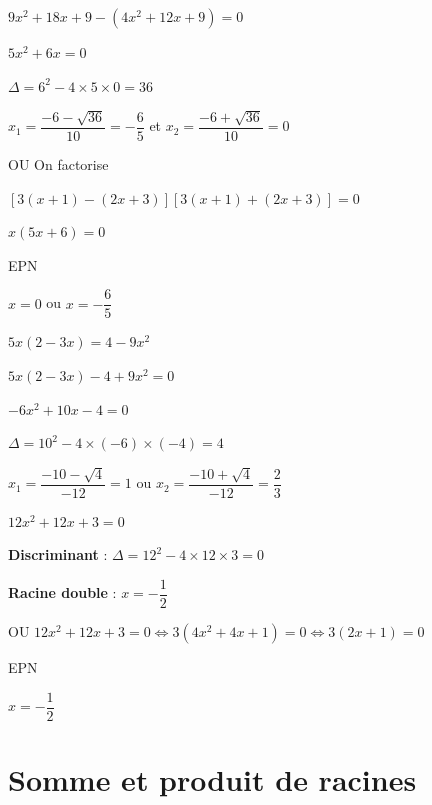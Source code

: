 \documentclass[11pt,a4paper]{article}  %
\begin{document}
\begin{enumMet}
\begin{corrBox}
\begin{minipage}[c]{0.48\linewidth}
				$9x^2+18x+9-(4x^2+12x+9)=0$
				
				$5x^2+6x=0$
				
				$\Delta=6^2-4\times 5\times 0=36$
				
				$x_1=\dfrac{-6-\sqrt{36}}{10}=-\dfrac{6}{5}$ et $x_2=\dfrac{-6+\sqrt{36}}{10}=0$
			\end{minipage} \hfill
			\begin{minipage}[c]{0.48\linewidth}
				OU On factorise
				
				$[3(x+1)-(2x+3)][3(x+1)+(2x+3)]=0$
				
				$x(5x+6)=0$
				
				EPN
				
				$x=0$ ou $x=-\dfrac{6}{5}$
			\end{minipage}		
		\end{corrBox}
		\item $5 x(2-3 x)=4-9 x^2$
		\begin{corrBox}
			$5 x(2-3 x)-4+9 x^2=0$
			
			$-6x^2+10x-4=0$
			
			$\Delta = 10^2 - 4 \times (-6) \times (-4) = 4$
			
			$x_1=\dfrac{-10-\sqrt{4}}{-12}=1$ ou $x_2=\dfrac{-10+\sqrt{4}}{-12}=\dfrac{2}{3}$		
		\end{corrBox}
		\item $12 x^2+12 x+3=0$
		\begin{corrBox}
			\begin{minipage}[c]{0.48\linewidth}
				\begin{itemMet}
					\item \textbf{Discriminant} : \( \Delta = 12^2 - 4 \times 12 \times 3 = 0 \)
					\item \textbf{Racine double} : \( x = -\dfrac{1}{2} \)
				\end{itemMet}
			\end{minipage} \hfill
			\begin{minipage}[c]{0.48\linewidth}
				OU
				$12 x^2+12 x+3=0 \iff 3(4x^2+4x+1)=0\iff3(2x+1)=0$
				
				EPN
				
				$x=-\dfrac{1}{2}$
			\end{minipage}		
		\end{corrBox}
	\end{enumMet}

\section*{Somme et produit de racines}
\end{document}
